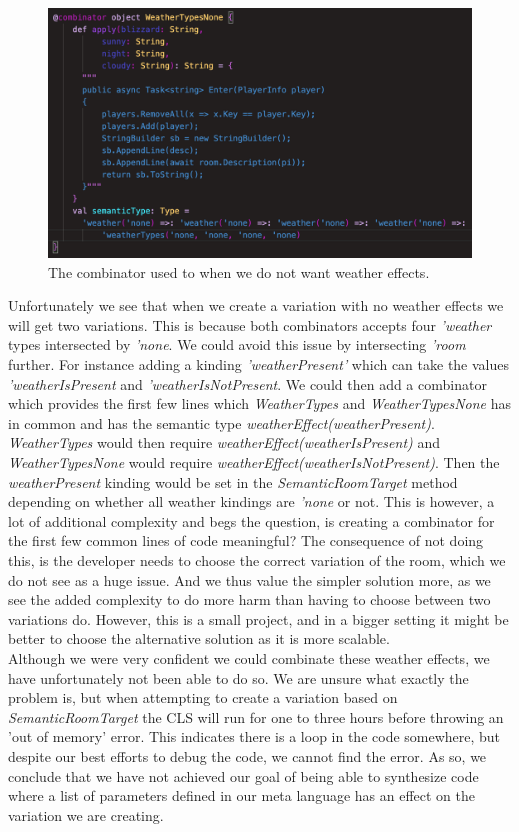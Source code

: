 \begin{figure}[H]
	\centering
	\includegraphics[width=\linewidth]{Materials/Decomposition/Room/NoneWeather}
	\caption{The combinator used to when we do not want weather effects.}
	\label{NoneWeather}
\end{figure}
Unfortunately we see that when we create a variation with no weather effects we will get two variations. This is because both combinators accepts four \textit{'weather} types intersected by \textit{'none}. We could avoid this issue by intersecting \textit{'room} further. For instance adding a kinding \textit{'weatherPresent'} which can take the values \textit{'weatherIsPresent} and \textit{'weatherIsNotPresent}. We could then add a combinator which provides the first few lines which \textit{WeatherTypes} and \textit{WeatherTypesNone} has in common and has the semantic type \textit{weatherEffect(weatherPresent)}. \textit{WeatherTypes} would then require \textit{weatherEffect(weatherIsPresent)} and \textit{WeatherTypesNone} would require \textit{weatherEffect(weatherIsNotPresent)}. Then the \textit{weatherPresent} kinding would be set in the \textit{SemanticRoomTarget} method depending on whether all weather kindings are \textit{'none} or not. This is however, a lot of additional complexity and begs the question, is creating a combinator for the first few common lines of code meaningful? The consequence of not doing this, is the developer needs to choose the correct variation of the room, which we do not see as a huge issue. And we thus value the simpler solution more, as we see the added complexity to do more harm than having to choose between two variations do. However, this is a small project, and in a bigger setting it might be better to choose the alternative solution as it is more scalable.\\

Although we were very confident we could combinate these weather effects, we have unfortunately not been able to do so. We are unsure what exactly the problem is, but when attempting to create a variation based on \textit{SemanticRoomTarget} the CLS will run for one to three hours before throwing an 'out of memory' error. This indicates there is a loop in the code somewhere, but despite our best efforts to debug the code, we cannot find the error. As so, we conclude that we have not achieved our goal of being able to synthesize code where a list of parameters defined in our meta language has an effect on the variation we are creating.

